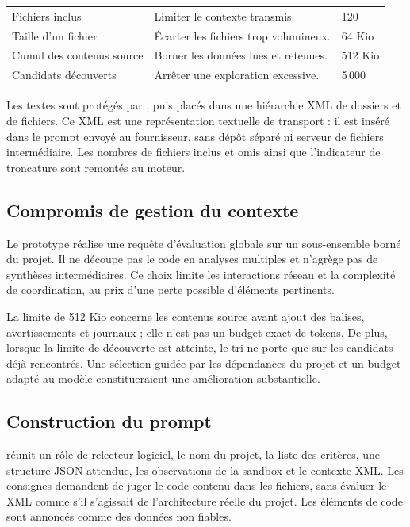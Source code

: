 \begin{tabularx}{\textwidth}{@{}P{49mm}YP{31mm}@{}}
\toprule
{} &  & \\
\midrule
Fichiers inclus & Limiter le contexte transmis. & 120\\
Taille d'un fichier & Écarter les fichiers trop volumineux. & 64 Kio\\
Cumul des contenus source & Borner les données lues et retenues. & 512 Kio\\
Candidats découverts & Arrêter une exploration excessive. & 5\,000\\
\bottomrule
\end{tabularx}

Les textes sont protégés par , puis placés dans une hiérarchie XML de dossiers et de fichiers. Ce XML est une représentation textuelle de transport : il est inséré dans le prompt envoyé au fournisseur, sans dépôt séparé ni serveur de fichiers intermédiaire. Les nombres de fichiers inclus et omis ainsi que l'indicateur de troncature sont remontés au moteur.

\subsection{Compromis de gestion du contexte}
Le prototype réalise une requête d'évaluation globale sur un sous-ensemble borné du projet. Il ne découpe pas le code en analyses multiples et n'agrège pas de synthèses intermédiaires. Ce choix limite les interactions réseau et la complexité de coordination, au prix d'une perte possible d'éléments pertinents.

La limite de 512 Kio concerne les contenus source avant ajout des balises, avertissements et journaux ; elle n'est pas un budget exact de tokens. De plus, lorsque la limite de découverte est atteinte, le tri ne porte que sur les candidats déjà rencontrés. Une sélection guidée par les dépendances du projet et un budget adapté au modèle constitueraient une amélioration substantielle.

\clearpage
{}
\subsection{Construction du prompt}
 réunit un rôle de relecteur logiciel, le nom du projet, la liste des critères, une structure JSON attendue, les observations de la sandbox et le contexte XML. Les consignes demandent de juger le code contenu dans les fichiers, sans évaluer le XML comme s'il s'agissait de l'architecture réelle du projet. Les éléments de code sont annoncés comme des données non fiables.

